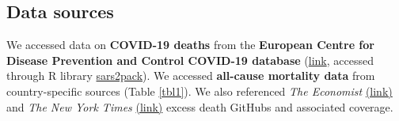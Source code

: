 \documentclass[
]{article}
\begin{document}
\bigskip

\hypertarget{data-sources}{%
\subsection{Data sources}\label{data-sources}}

We accessed data on \textbf{COVID-19 deaths} from the
\textbf{European Centre for Disease Prevention and Control COVID-19 database}
(\href{https://www.ecdc.europa.eu/en/publications-data/download-todays-data-geographic-distribution-covid-19-cases-worldwide}{link},
accessed through R library
\href{https://github.com/seandavi/sars2pack}{sars2pack}). We accessed
\textbf{all-cause mortality data} from country-specific sources (Table
\ref{tbl1}). We also referenced \emph{The Economist}
\href{https://github.com/TheEconomist/covid-19-excess-deaths-tracker}{(link)}
and \emph{The New York Times}
\href{https://github.com/nytimes/covid-19-data/tree/master/excess-deaths}{(link)}
excess death GitHubs and associated coverage.
\end{document}
